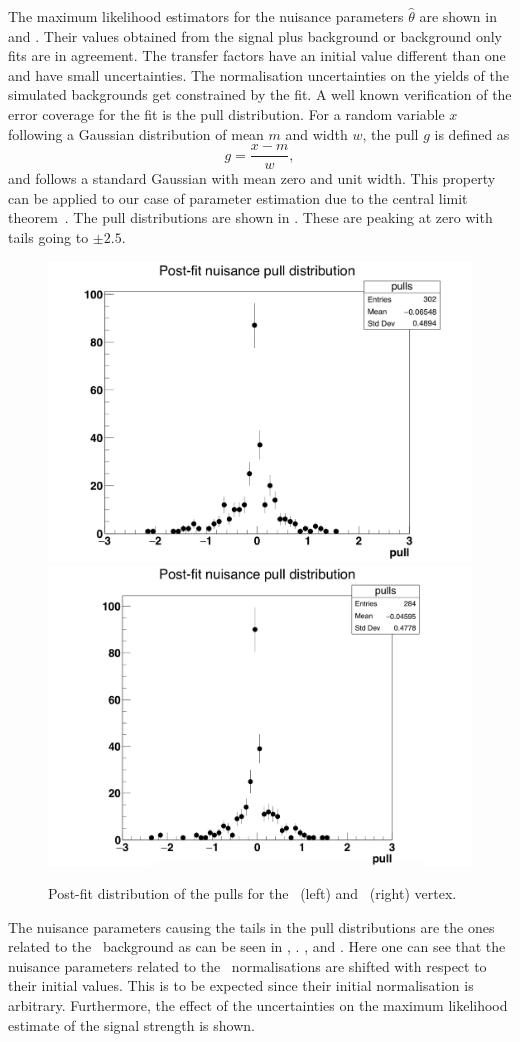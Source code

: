 The maximum likelihood estimators for the nuisance parameters $\hat{\theta}$ are shown in  and . Their values obtained from the signal plus background or background only fits are in agreement. The transfer factors have an initial value different than one and have small uncertainties. The normalisation uncertainties on the yields of the simulated backgrounds get constrained by the fit.  A well known verification of the error coverage for the fit is the pull distribution. For a random variable $x$ following a Gaussian distribution of mean $m$ and width $w$, the pull $g$ is defined as
\begin{equation}
 g = \frac{x - m}{w},
\end{equation}
and follows a standard Gaussian with mean zero and unit width. This property can be applied to our case of parameter estimation due to the central limit theorem~\cite{CDF:AN5776}. The pull distributions are shown in . These are peaking at zero with tails going to $\pm2.5$.
\begin{figure}[htbp]
	\centering
	\includegraphics[width=.49\linewidth]{6_Search/Figures/impact/pullsZutwithMC.pdf}
	\includegraphics[width=.49\linewidth]{6_Search/Figures/impact/pullsZctwithMC.pdf}
	\caption{Post-fit distribution of the pulls for the \Zut\ (left) and \Zct\ (right) vertex.}
	\label{fig:pulls}
\end{figure}

\newpage
 The nuisance parameters causing the tails in the pull distributions are the ones related to the \NPL\ background as can be seen in , . , and . Here one can see that the nuisance parameters related to the \NPL\ normalisations are shifted with respect to their initial values. This is to be expected since their initial  normalisation is arbitrary. Furthermore, the effect of the uncertainties on the maximum likelihood estimate of the signal strength is shown.  
 
